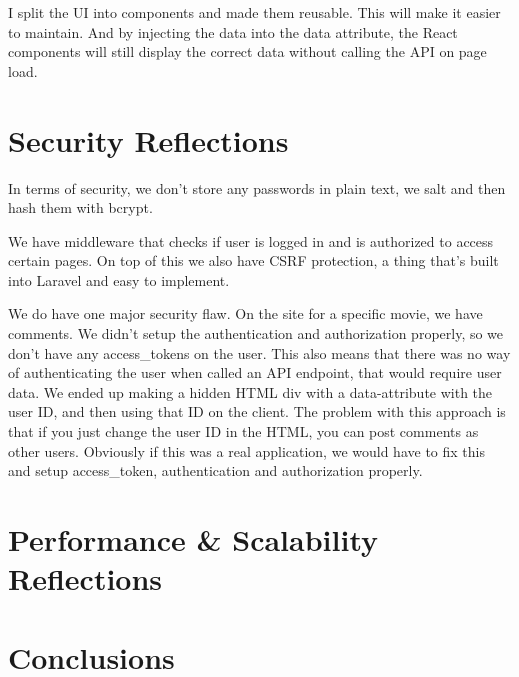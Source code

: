 \documentclass[letterpaper,twocolumn]{article}
\begin{document}
I split the UI into components and made them reusable.
This will make it easier to maintain.
And by injecting the data into the data attribute,
the React components will still display the correct data without calling the API on page load.

\section{Security Reflections}

In terms of security, we don't store any passwords in plain text, we salt and then hash them with bcrypt.

We have middleware that checks if user is logged in and is authorized to access certain pages.
On top of this we also have CSRF protection, a thing that's built into Laravel and easy to implement.

We do have one major security flaw. On the site for a specific movie, we have comments. We didn't setup the authentication and authorization properly, so we don't have any access\_tokens on the user.
This also means that there was no way of authenticating the user when called an API endpoint, that would require user data.
We ended up making a hidden HTML div with a data-attribute with the user ID, and then using that ID on the client.
The problem with this approach is that if you just change the user ID in the HTML, you can post comments as other users.
Obviously if this was a real application, we would have to fix this and setup access\_token, authentication and authorization properly.


\section{Performance \& Scalability Reflections}


\section{Conclusions}
\end{document}
